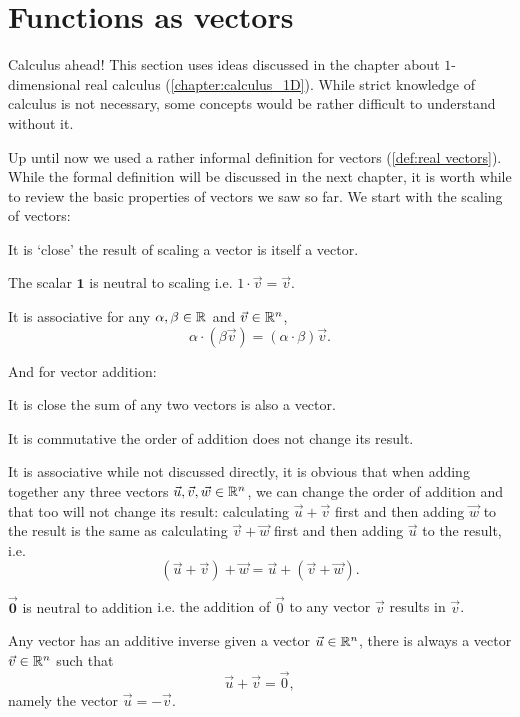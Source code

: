 \section{Functions as vectors}
\begin{note}{Calculus ahead!}{}
	This section uses ideas discussed in the chapter about $1$-dimensional real calculus (\autoref{chapter:calculus_1D}). While strict knowledge of calculus is not necessary, some concepts would be rather difficult to understand without it.
\end{note}

Up until now we used a rather informal definition for vectors (\autoref{def:real vectors}). While the formal definition will be discussed in the next chapter, it is worth while to review the basic properties of vectors we saw so far. We start with the scaling of vectors:
\begin{descitemize}
	\item[It is `close'] the result of scaling a vector is itself a vector.
	\item[The scalar $\bm{1}$ is neutral to scaling] i.e. $1\cdot\vec{v}=\vec{v}$.
	\item[It is associative] for any $\alpha,\beta\in\Rs$ and $\vec{v}\in\Rs[n]$,
		\[
			\alpha\cdot \left( \beta\vec{v} \right) = \left( \alpha\cdot\beta \right)\vec{v}.
		\]
\end{descitemize}

And for vector addition:
\begin{descitemize}
	\item[It is close] the sum of any two vectors is also a vector.
	\item[It is commutative] the order of addition does not change its result.
	\item[It is associative] while not discussed directly, it is obvious that when adding together any three vectors $\vec{u},\vec{v},\vec{w}\in \Rs[n]$, we can change the order of addition and that too will not change its result: calculating $\vec{u}+\vec{v}$ first and then adding $\vec{w}$ to the result is the same as calculating $\vec{v}+\vec{w}$ first and then adding $\vec{u}$ to the result, i.e.
		\[
			\left( \vec{u}+\vec{v} \right) + \vec{w} = \vec{u} + \left( \vec{v}+\vec{w} \right).
		\]
	\item[$\bm{\vec{0}}$ is neutral to addition] i.e. the addition of $\vec{0}$ to any vector $\vec{v}$ results in $\vec{v}$.
	\item[Any vector has an additive inverse] given a vector $\vec{u}\in\Rs[n]$, there is always a vector $\vec{v}\in\Rs[n]$ such that
		\[
			\vec{u}+\vec{v}=\vec{0},
		\]
		namely the vector $\vec{u}=-\vec{v}$.
\end{descitemize}

